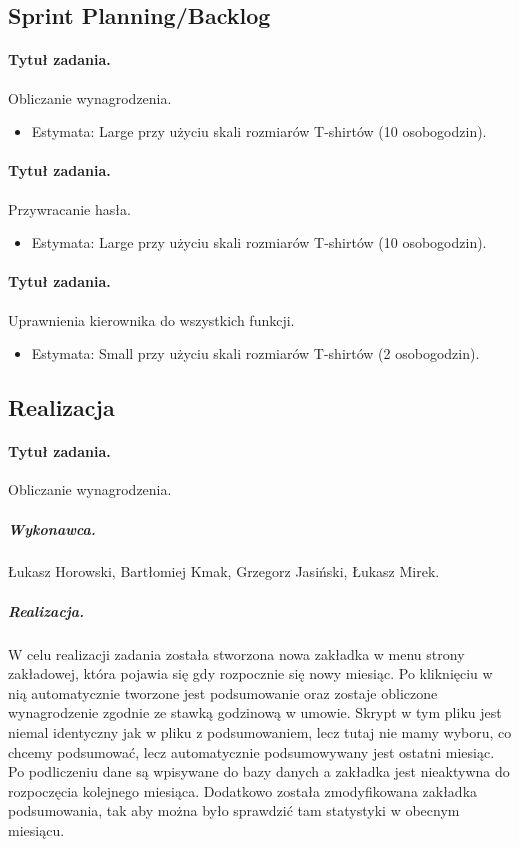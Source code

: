 \documentclass[a4paper]{article}
\begin{document}
\subsection{Sprint Planning/Backlog}

\paragraph{Tytuł zadania.} Obliczanie wynagrodzenia.
\begin{itemize}
\item Estymata: Large przy użyciu skali rozmiarów T-shirtów (10 osobogodzin).
\end{itemize}

\paragraph{Tytuł zadania.} Przywracanie hasła.
\begin{itemize}
\item Estymata: Large przy użyciu skali rozmiarów T-shirtów (10 osobogodzin).
\end{itemize}

\paragraph{Tytuł zadania.} Uprawnienia kierownika do wszystkich funkcji.
\begin{itemize}
\item Estymata: Small przy użyciu skali rozmiarów T-shirtów (2 osobogodzin).
\end{itemize}


\subsection{Realizacja}

\paragraph{Tytuł zadania.} Obliczanie wynagrodzenia.
\subparagraph{Wykonawca.} Łukasz Horowski, Bartłomiej Kmak, Grzegorz Jasiński, Łukasz Mirek.
\subparagraph{Realizacja.}  W celu realizacji zadania została stworzona nowa zakładka w menu strony zakładowej, która pojawia się gdy rozpocznie się nowy miesiąc. Po kliknięciu w nią automatycznie tworzone jest podsumowanie oraz zostaje obliczone wynagrodzenie zgodnie ze stawką godzinową w umowie. Skrypt w tym pliku jest niemal identyczny jak w pliku z podsumowaniem, lecz tutaj nie mamy wyboru, co chcemy podsumować, lecz automatycznie podsumowywany jest ostatni miesiąc. Po podliczeniu dane są wpisywane do bazy danych a zakładka jest nieaktywna do rozpoczęcia kolejnego miesiąca. Dodatkowo została zmodyfikowana zakładka podsumowania, tak aby można było sprawdzić tam statystyki w obecnym miesiącu.
\end{document}
